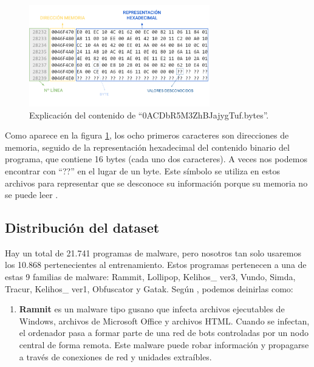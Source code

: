 \begin{figure}[h]
    \begin{center}
    \includegraphics[width=0.7\textwidth]{img/previewMMC.png}
    \end{center}
    \caption{Explicación del contenido de ``0ACDbR5M3ZhBJajygTuf.bytes''.}
    \label{fig:previewMMC}
\end{figure} 


Como aparece en la figura \ref{fig:previewMMC}, los ocho primeros caracteres son direcciones de memoria, seguido de la representación hexadecimal del contenido binario del programa, que contiene 16 bytes (cada uno dos caracteres). A veces nos podemos encontrar con ``??'' en el lugar de un byte. Este símbolo se utiliza en estos archivos para representar que se desconoce su información porque su memoria no se puede leer \citep{cahyani2022influence}. 


\subsection{Distribución del dataset}

Hay un total de 21.741 programas de malware, pero nosotros tan solo usaremos los 10.868 pertenecientes al entrenamiento. Estos programas pertenecen a una de estas 9 familias de malware: Rammit, Lollipop, Kelihos\_ ver3, Vundo, Simda, Tracur, Kelihos\_ ver1, Obfuscator y Gatak. Según \cite{hu2019machine}, podemos deinirlas como: 

  

\begin{enumerate}

\item \textbf{Ramnit} es un malware tipo gusano que infecta archivos ejecutables de Windows, archivos de Microsoft Office y archivos HTML. Cuando se infectan, el ordenador pasa a formar parte de una red de bots controladas por un nodo central de forma remota. Este malware puede robar información y propagarse a través de conexiones de red y unidades extraíbles.

\end{enumerate}


